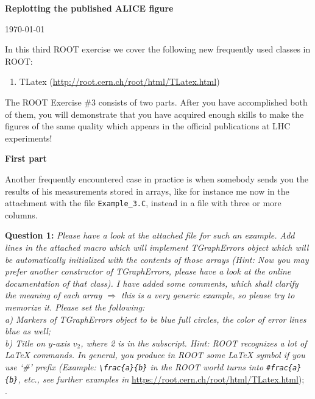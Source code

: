 \documentclass[11pt]{article}
\begin{document}
\begin{center}
\Large{\bf{Replotting the published ALICE figure}}\\
\end{center}
\begin{center}
{\small\today}
\end{center}

\bigskip

\noindent In this third ROOT exercise we cover the following new frequently used classes in ROOT:
%
\begin{enumerate}
\item TLatex (\url{http://root.cern.ch/root/html/TLatex.html})
\end{enumerate} 
%

\noindent The ROOT Exercise \#3 consists of two parts. After you have accomplished both of them, you will demonstrate that you have acquired enough skills to make the figures of the same quality which appears in the official publications at LHC experiments! 

\bigskip\bigskip\bigskip

\noindent \textbf{\Large First part}

\noindent Another frequently encountered case in practice is when somebody sends you the results of his measurements stored in arrays, like for instance me now in the attachment with the file \verb|Example_3.C|, instead in a file with three or more columns. 

\bigskip

\noindent\textbf{Question 1:} {\it Please have a look at the attached file for such an example. Add lines in the attached macro which will implement TGraphErrors object which will be automatically initialized with the contents of those arrays (Hint: Now you may prefer another constructor of TGraphErrors, please have a look at the online documentation of that class). I have added some comments, which shall clarify the meaning of each array $\Rightarrow$ this is a very generic example, so please try to memorize it. Please set the following:\\
%
\noindent a) Markers of TGraphErrors object to be blue full circles, the color of error lines blue as well;\\
%
\noindent b) Title on $y$-axis $v_2$, where 2 is in the subscript. Hint: ROOT recognizes a lot of LaTeX commands. In general, you produce in ROOT some LaTeX symbol if you use `\#' prefix (Example: \verb|\frac{a}{b}| in the ROOT world turns into \verb|#frac{a}{b}|, etc., see further examples in} \url{https://root.cern.ch/root/html/TLatex.html});\\
%
.
\end{document}
